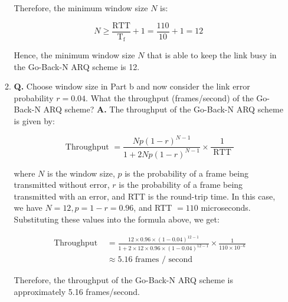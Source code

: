 \documentclass[main.tex]{subfiles}
\begin{document}
\begin{enumerate}
\begin{enumerate}
        Therefore, the minimum window size $N$ is:
        
        $$
        N \geq \frac{\mathrm{RTT}}{\mathrm{T}_{\mathrm{f}}}+1=\frac{110}{10}+1=12
        $$
        
        Hence, the minimum window size $N$ that is able to keep the link busy in the Go-Back-N ARQ scheme is 12.
        \item \textbf{Q.} Choose window size in Part b and now consider the link error probability $r=0.04$. What the throughput (frames/second) of the Go-Back-N ARQ scheme? \textbf{A.} The throughput of the Go-Back-N ARQ scheme is given by:
        
        $$
        \text { Throughput }=\frac{N p(1-r)^{N-1}}{1+2 N p(1-r)^{N-1}} \times \frac{1}{\text { RTT }}
        $$
        
        where $N$ is the window size, $p$ is the probability of a frame being transmitted without error, $r$ is the probability of a frame being transmitted with an error, and RTT is the round-trip time.
        In this case, we have $N=12, p=1-r=0.96$, and RTT $=110$ microseconds. Substituting these values into the formula above, we get:
        
        $$
        \begin{aligned}
        \text { Throughput }&=\frac{12 \times 0.96 \times(1-0.04)^{12-1}}{1+2 \times 12 \times 0.96 \times(1-0.04)^{12-1}} \times \frac{1}{110 \times 10^{-6}}\\ &\approx 5.16 \text { frames } / \text { second }
        \end{aligned}
        $$
        
        Therefore, the throughput of the Go-Back-N ARQ scheme is approximately 5.16 frames/second.
    \end{enumerate}

\end{enumerate}
\end{document}
